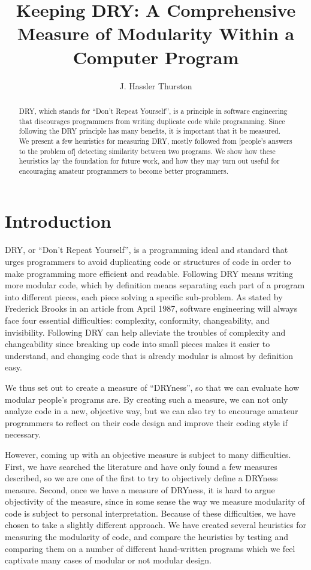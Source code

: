 \documentclass{article}
\title{Keeping DRY: A Comprehensive Measure of Modularity Within a Computer Program}
\author{J. Hassler Thurston}
\date{}
\begin{document}
\maketitle

\begin{abstract}

DRY, which stands for ``Don't Repeat Yourself'', is a principle in software engineering that discourages programmers from
writing duplicate code while programming. Since following the DRY principle has many benefits, it is important that it 
be measured. We present a few heuristics for measuring DRY, mostly followed from [people's answers to the problem of] detecting
similarity between two programs. We show how these heuristics lay the foundation for future work, and how they
 may turn out useful for encouraging amateur programmers to become better programmers.

\end{abstract}

\section{Introduction} DRY, or ``Don't Repeat Yourself'', is a programming ideal and standard that urges programmers to avoid duplicating code or structures of code in order to make programming more efficient and readable. Following DRY means writing more modular
code, which by definition means separating each part of a program into different pieces, each piece solving a specific sub-problem. As stated by Frederick Brooks in an article
from April 1987\cite{NoSilverBullet}, software engineering will always face four essential difficulties: complexity, conformity, 
changeability, and invisibility. Following DRY can help alleviate the troubles of complexity and changeability since breaking up code
into small pieces makes it easier to understand, and changing code that is already modular is almost by definition easy.

We thus set out to create a measure of ``DRYness'', so that we can evaluate how modular people's programs are.
By creating such a measure, we can not only analyze code in a new, objective way, but we can also try to encourage amateur programmers
to reflect on their code design and improve their coding style if necessary.

However, coming up with an objective measure is subject to many difficulties. First, we have searched the literature and have only found a few measures described, so we are one of the first to try to objectively define a DRYness measure.
Second, once we have a measure of DRYness,
it is hard to argue objectivity of the measure, since in some sense the way we measure modularity of code is subject to personal
interpretation. Because of these difficulties, we have chosen to take a slightly different approach. We have created several 
heuristics for measuring the modularity of code, and compare the heuristics by testing and comparing them on a number of different
hand-written programs which we feel captivate many cases of modular or not modular design.
\end{document}
